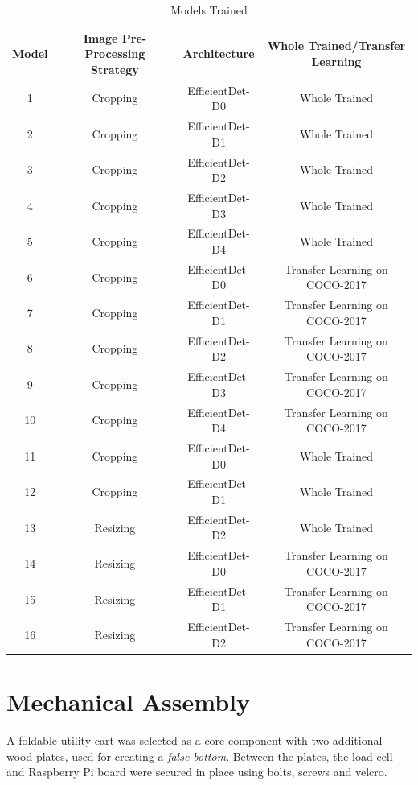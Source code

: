 \documentclass[openright]{normas-utf-tex} %
\begin{document}
\begin{table}[H]
	\centering
	\begin{adjustbox}{width=1\textwidth}
	\label{tab:modelsTrained}
	\begin{tabular}{c|c|c|c}
		\hline 
		Model & Image Pre-Processing Strategy & Architecture & Whole Trained/Transfer Learning \\
		\hline
        1 & Cropping & EfficientDet-D0 & Whole Trained \\
		2 & Cropping & EfficientDet-D1 & Whole Trained \\
		3 & Cropping & EfficientDet-D2 & Whole Trained \\
		4 & Cropping & EfficientDet-D3 & Whole Trained \\
		5 & Cropping & EfficientDet-D4 & Whole Trained \\
		6 & Cropping & EfficientDet-D0 & Transfer Learning on COCO-2017 \\
		7 & Cropping & EfficientDet-D1 & Transfer Learning on COCO-2017 \\
		8 & Cropping & EfficientDet-D2 & Transfer Learning on COCO-2017 \\
		9 & Cropping & EfficientDet-D3 & Transfer Learning on COCO-2017 \\
		10 & Cropping & EfficientDet-D4 & Transfer Learning on COCO-2017 \\
		11 & Cropping & EfficientDet-D0 & Whole Trained \\
		12 & Cropping & EfficientDet-D1 & Whole Trained \\
		13 & Resizing & EfficientDet-D2 & Whole Trained \\
		14 & Resizing & EfficientDet-D0 & Transfer Learning on COCO-2017 \\
		15 & Resizing & EfficientDet-D1 & Transfer Learning on COCO-2017 \\
		16 & Resizing & EfficientDet-D2 & Transfer Learning on COCO-2017 \\
		\hline 
	\end{tabular}
	\end{adjustbox}
	\caption[Models Trained]{Models Trained}
	\label{tbl:modelsTrainedTab}
\end{table}

\section{Mechanical Assembly}

A foldable utility cart was selected as a core
component with two additional wood plates, used for creating a \textit{false
bottom}. Between the plates, the load cell and Raspberry Pi board were secured
in place using bolts, screws and velcro.
\end{document}
